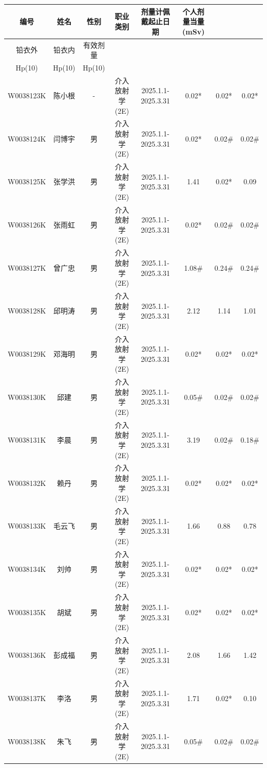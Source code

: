 \begin{table}[H]
\centering
\begin{tabular}{|c|c|c|c|c|c|c|c|}
\hline
编号 & 姓名 & 性别 & 职业类别 & 剂量计佩戴起止日期 & 个人剂量当量(mSv) &  &  \\
\hline
铅衣外 & 铅衣内 & 有效剂量 &  &  &  &  &  \\
\hline
Hp(10) & Hp(10) & Hp(10) &  &  &  &  &  \\
\hline
W0038123K & 陈小根 & - & 介入放射学(2E) & 2025.1.1-2025.3.31 & 0.02* & 0.02* & 0.02* \\
\hline
W0038124K & 闫博宇 & 男 & 介入放射学(2E) & 2025.1.1-2025.3.31 & 0.02* & 0.02\# & 0.02\# \\
\hline
W0038125K & 张学洪 & 男 & 介入放射学(2E) & 2025.1.1-2025.3.31 & 1.41 & 0.02* & 0.09 \\
\hline
W0038126K & 张雨虹 & 男 & 介入放射学(2E) & 2025.1.1-2025.3.31 & 0.02* & 0.02\# & 0.02\# \\
\hline
W0038127K & 曾广忠 & 男 & 介入放射学(2E) & 2025.1.1-2025.3.31 & 1.08\# & 0.24\# & 0.24\# \\
\hline
W0038128K & 邱明涛 & 男 & 介入放射学(2E) & 2025.1.1-2025.3.31 & 2.12 & 1.14 & 1.01 \\
\hline
W0038129K & 邓海明 & 男 & 介入放射学(2E) & 2025.1.1-2025.3.31 & 0.02* & 0.02* & 0.02* \\
\hline
W0038130K & 邱建 & 男 & 介入放射学(2E) & 2025.1.1-2025.3.31 & 0.05\# & 0.02\# & 0.02\# \\
\hline
W0038131K & 李晨 & 男 & 介入放射学(2E) & 2025.1.1-2025.3.31 & 3.19 & 0.02\# & 0.18\# \\
\hline
W0038132K & 赖丹 & 男 & 介入放射学(2E) & 2025.1.1-2025.3.31 & 0.02* & 0.02* & 0.02* \\
\hline
W0038133K & 毛云飞 & 男 & 介入放射学(2E) & 2025.1.1-2025.3.31 & 1.66 & 0.88 & 0.78 \\
\hline
W0038134K & 刘帅 & 男 & 介入放射学(2E) & 2025.1.1-2025.3.31 & 0.02* & 0.02* & 0.02* \\
\hline
W0038135K & 胡斌 & 男 & 介入放射学(2E) & 2025.1.1-2025.3.31 & 0.02* & 0.02* & 0.02* \\
\hline
W0038136K & 彭成福 & 男 & 介入放射学(2E) & 2025.1.1-2025.3.31 & 2.08 & 1.66 & 1.42 \\
\hline
W0038137K & 李洛 & 男 & 介入放射学(2E) & 2025.1.1-2025.3.31 & 1.71 & 0.02* & 0.10 \\
\hline
W0038138K & 朱飞 & 男 & 介入放射学(2E) & 2025.1.1-2025.3.31 & 0.05\# & 0.02\# & 0.02\# \\

\end{tabular}
\end{table}

